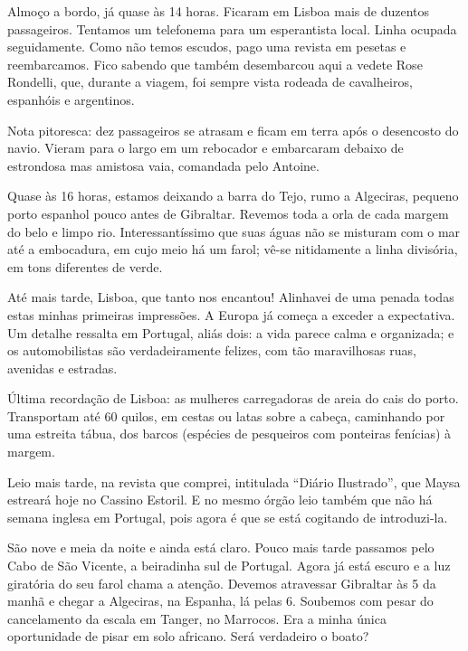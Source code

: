 Almoço a bordo, já quase às 14 horas. Ficaram em Lisboa mais de duzentos passageiros. Tentamos um telefonema para um esperantista local. Linha ocupada seguidamente. Como não temos escudos, pago uma revista em pesetas e reembarcamos. Fico sabendo que também desembarcou aqui a vedete Rose Rondelli, que, durante a viagem, foi sempre vista rodeada de cavalheiros, espanhóis e argentinos.

Nota pitoresca: dez passageiros se atrasam e ficam em terra após o desencosto do navio. Vieram para o largo em um rebocador e embarcaram debaixo de estrondosa mas amistosa vaia, comandada pelo Antoine.

Quase às 16 horas, estamos deixando a barra do Tejo, rumo a Algeciras, pequeno porto espanhol pouco antes de Gibraltar. Revemos toda a orla de cada margem do belo e limpo rio. Interessantíssimo que suas águas não se misturam com o mar até a embocadura, em cujo meio há um farol; vê-se nitidamente a linha divisória, em tons diferentes de verde.

Até mais tarde, Lisboa, que tanto nos encantou! Alinhavei de uma penada todas estas minhas primeiras impressões. A Europa já começa a exceder a expectativa. Um detalhe ressalta em Portugal, aliás dois: a vida parece calma e organizada; e os automobilistas são verdadeiramente felizes, com tão maravilhosas ruas, avenidas e estradas.

Última recordação de Lisboa: as mulheres carregadoras de areia do cais do porto. Transportam até 60 quilos, em cestas ou latas sobre a cabeça, caminhando por uma estreita tábua, dos barcos (espécies de pesqueiros com ponteiras fenícias) à margem.

Leio mais tarde, na revista que comprei, intitulada ``Diário Ilustrado'', que Maysa estreará hoje no Cassino Estoril. E no mesmo órgão leio também que não há semana inglesa em Portugal, pois agora é que se está cogitando de introduzi-la.

São nove e meia da noite e ainda está claro. Pouco mais tarde passamos pelo Cabo de São Vicente, a beiradinha sul de Portugal. Agora já está escuro e a luz giratória do seu farol chama a atenção. Devemos atravessar Gibraltar às 5 da manhã e chegar a Algeciras, na Espanha, lá pelas 6. Soubemos com pesar do cancelamento da escala em Tanger, no Marrocos. Era a minha única oportunidade de pisar em solo africano. Será verdadeiro o boato?

